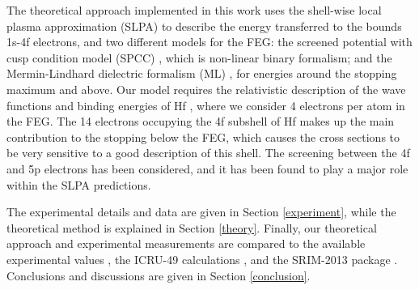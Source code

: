 \documentclass[aps,prb,reprint,groupedaddress]{revtex4-1}
\begin{document}
The theoretical approach implemented in this work uses the shell-wise local plasma approximation (SLPA) \cite{mon13} to describe the energy transferred to the bounds 1s-4f electrons, and two different models for the FEG: the screened potential with cusp condition model (SPCC) \cite{mon17}, which is non-linear binary formalism; and the Mermin-Lindhard dielectric formalism (ML) \cite{Mermin}, for energies around the stopping maximum and above. 
Our model requires the relativistic description of the wave functions and binding energies of Hf \cite{mendez2019}, where we consider 4 electrons per atom in the FEG. 
The 14 electrons occupying the 4f subshell of Hf makes up the main contribution to the stopping below the FEG, which causes the cross sections to be very sensitive to a good description of this shell. 
The screening between the 4f and 5p electrons has been considered, and it has been found to play a major role within the SLPA predictions.


The experimental details and data are given in Section \ref{experiment}, while the theoretical method is explained in Section \ref{theory}. Finally, our theoretical approach and experimental measurements are compared to the available experimental values \cite{Sirotinin}, the ICRU-49 calculations \cite{ICRU49}, and the SRIM-2013 package \cite{Ziegler01}. Conclusions and discussions are given in Section \ref{conclusion}.

\end{document}
